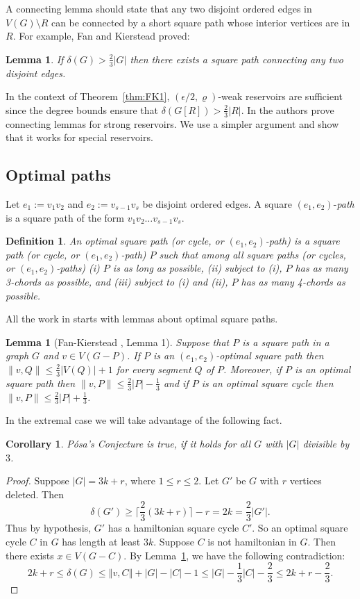 \documentclass[oneside,12pt]{memoir}
\newtheorem{lemma}[theorem]{Lemma}
\newtheorem{corollary}[theorem]{Corollary}
\newtheorem{definition}[theorem]{Definition}
\newcommand{\ep}{\epsilon}
\begin{document}
A connecting lemma should state that any two disjoint ordered edges in $V(G)\setminus R$
can be connected by a short square path whose interior vertices are in
$R$. For example, Fan and Kierstead \cite{FK1} proved:
\begin{lemma}
If $\delta(G)>\frac{2}{3}|G|$ then there exists a square path connecting
any two disjoint edges.
\end{lemma}
\noindent In the context of Theorem~\ref{thm:FK1}, $(\ep/2,\varrho)$-weak
reservoirs are sufficient since the degree bounds ensure that $\delta(G[R])>\frac{2}{3}|R|$.
In \cite{LSS,RRS2} the authors prove connecting lemmas for strong
reservoirs. We use a simpler argument and show that it works for special
reservoirs.


\subsection{Optimal paths}

Let $e_{1}:=v_1v_2$ and $e_{2}:=v_{s-1}v_s$ be disjoint ordered edges. A square $(e_{1},e_{2})$-\emph{path} is a square path of the form $v_1v_2\dots v_{s-1}v_s$.
\begin{definition}
An \emph{optimal} square path (or cycle, or $(e_{1},e_{2})$-path)
is a square path (or cycle, or $(e_{1},e_{2})$-path) $P$ such
that among all square paths (or cycles, or $(e_{1},e_{2})$-paths)
(i) $P$ is as long as possible, (ii) subject to (i), $P$ has as
many 3-chords as possible, and (iii) subject to (i) and (ii), $P$
has as many 4-chords as possible. 
\end{definition}
All the work in \cite{FK1,FK2,FK3} starts with lemmas about optimal
square paths. 

\begin{lemma}
[Fan-Kierstead \cite{FK1}, \cite{FK2} Lemma 1]\label{segment} Suppose that
$P$ is a square path in a graph $G$ and $v\in V(G-P)$.
If $P$ is an $(e_{1},e_{2})$-optimal square path then $\|v,Q\|\leq\frac{2}{3}|V(Q)|+1$
for every segment $Q$ of $P$. Moreover, if $P$ is an optimal square
path then $\|v,P\|\leq\frac{2}{3}|P|-\frac{1}{3}$ and if $P$ is
an optimal square cycle then $ \|v,P\|\leq\frac{2}{3}|P|+\frac{1}{3}$.
\end{lemma}

In the extremal case we will take advantage of the following fact.

\begin{corollary}\label{3k}
P\'osa's Conjecture is true, if it holds for all $G$ with $|G|$ divisible by $3$. 
\end{corollary}
\begin{proof}Suppose $|G|=3k+r$, where
$1\le r\le2$. Let $G'$ be $G$  with $r$ vertices deleted. Then $$\delta(G')\ge\lceil\frac{2}{3}(3k+r)\rceil-r=2k=\frac{2}{3}|G'|.$$
Thus by hypothesis, $G'$ has a hamiltonian square cycle $C'$. So an optimal
square cycle $C$ in $G$ has length at least $3k.$ Suppose $C$
is not hamiltonian in $G$. Then there exists $x\in V(G-C)$. By Lemma~\ref{segment},
we have the following contradiction: \[
2k+r\leq\delta(G)\leq\left\Vert v,C\right\Vert +|G|-|C|-1\le|G|-\frac{1}{3}|C|-\frac{2}{3}\leq 2k+r-\frac{2}{3}.\]
\end{proof}
\end{document}
